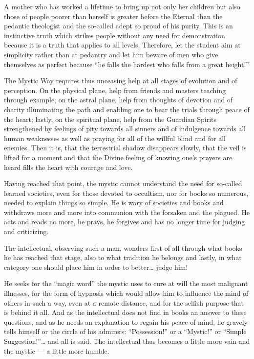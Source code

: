 A mother who has worked a lifetime to bring up not only her children but also those of
people poorer than herself is greater before the Eternal than the pedantic theologist and
the so-called adept so proud of his purity. This is an instinctive truth which strikes people
without any need for demonstration because it is a truth that applies to all levels. 
Therefore, let the student aim at simplicity rather than at pedantry and let him beware
of men who give themselves as perfect because ``he falls the hardest who falls from a great
height!''

The Mystic Way requires thus unceasing help at all stages of evolution and of
perception. On the physical plane, help from friends and masters teaching through
example; on the astral plane, help from thoughts of devotion and of charity illuminating the
path and enabling one to bear the trials through peace of the heart; lastly, on the spiritual
plane, help from the Guardian Spirits strengthened by feelings of pity towards all sinners
and of indulgence towards all human weaknesses as well as praying for all of the willful
blind and for all enemies. Then it is, that the terrestrial shadow disappears slowly, that the
veil is lifted for a moment and that the Divine feeling of knowing one's prayers are heard
fills the heart with courage and love.

Having reached that point, the mystic cannot understand the need for so-called learned
societies, even for those devoted to occultism, nor for books so numerous, needed to
explain things so simple. He is wary of societies and books and withdraws more and more
into communion with the forsaken and the plagued. He acts and reads no more, he prays, he
forgives and has no longer time for judging and criticizing.

The intellectual, observing such a man, wonders first of all through what books he has
reached that stage, also to what tradition he belongs and lastly, in what category one should
place him in order to better\ldots{} judge him!

He seeks for the ``magic word'' the mystic uses to cure at will the most malignant
illnesses, for the form of hypnosis which would allow him to influence the mind of others in
such a way, even at a remote distance, and for the selfish purpose that is behind it all. And as
the intellectual does not find in books an answer to these questions, and as he needs an
explanation to regain his peace of mind, he gravely tells himself or the circle of his
admirers: ``Possession!'' or a ``Mystic!'' or ``Simple Suggestion!''\ldots{}  and all is said. The
intellectual thus becomes a little more vain and the mystic --- a little more humble.

